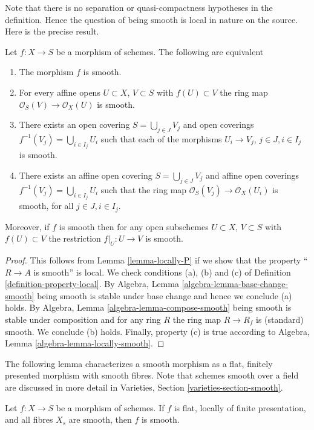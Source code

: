 \medskip\noindent
Note that there is no separation or quasi-compactness hypotheses in the
definition. Hence the question of being smooth is local in nature on
the source. Here is the precise result.

\begin{lemma}
\label{lemma-smooth-characterize}
Let $f : X \to S$ be a morphism of schemes.
The following are equivalent
\begin{enumerate}
\item The morphism $f$ is smooth.
\item For every affine opens $U \subset X$, $V \subset S$
with $f(U) \subset V$ the ring map
$\mathcal{O}_S(V) \to \mathcal{O}_X(U)$ is smooth.
\item There exists an open covering $S = \bigcup_{j \in J} V_j$
and open coverings $f^{-1}(V_j) = \bigcup_{i \in I_j} U_i$ such
that each of the morphisms $U_i \to V_j$, $j\in J, i\in I_j$
is smooth.
\item There exists an affine open covering $S = \bigcup_{j \in J} V_j$
and affine open coverings $f^{-1}(V_j) = \bigcup_{i \in I_j} U_i$ such
that the ring map $\mathcal{O}_S(V_j) \to \mathcal{O}_X(U_i)$ is
smooth, for all $j\in J, i\in I_j$.
\end{enumerate}
Moreover, if $f$ is smooth then for
any open subschemes $U \subset X$, $V \subset S$ with $f(U) \subset V$
the restriction $f|_U : U \to V$ is smooth.
\end{lemma}

\begin{proof}
This follows from Lemma \ref{lemma-locally-P} if we show that
the property ``$R \to A$ is smooth'' is local.
We check conditions (a), (b) and (c) of Definition
\ref{definition-property-local}.
By Algebra, Lemma \ref{algebra-lemma-base-change-smooth}
being smooth is stable under base change and hence
we conclude (a) holds. By
Algebra, Lemma \ref{algebra-lemma-compose-smooth}
being smooth is stable under composition and for any ring
$R$ the ring map $R \to R_f$ is (standard) smooth.
We conclude (b) holds. Finally, property (c) is true
according to Algebra, Lemma \ref{algebra-lemma-locally-smooth}.
\end{proof}

\noindent
The following lemma characterizes a smooth morphism as a
flat, finitely presented morphism with smooth fibres.
Note that schemes smooth over a field are discussed in more detail in
Varieties, Section \ref{varieties-section-smooth}.

\begin{lemma}
\label{lemma-smooth-flat-smooth-fibres}
Let $f : X \to S$ be a morphism of schemes.
If $f$ is flat, locally of finite presentation, and all
fibres $X_s$ are smooth, then $f$
is smooth.
\end{lemma}

